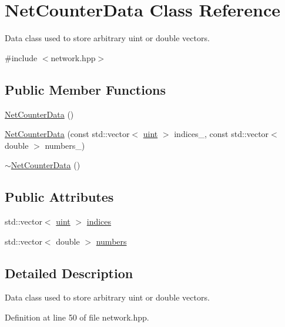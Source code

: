\hypertarget{class_net_counter_data}{}\section{Net\+Counter\+Data Class Reference}
\label{class_net_counter_data}


Data class used to store arbitrary uint or double vectors.  




{\ttfamily \#include $<$network.\+hpp$>$}

\subsection*{Public Member Functions}
\begin{DoxyCompactItemize}
\item 
\hyperlink{class_net_counter_data_ac3a5083286ad4fad43e6b6d5db1f7caa}{Net\+Counter\+Data} ()
\item 
\hyperlink{class_net_counter_data_ac816e1f8892a4d6f500df387309c1b1b}{Net\+Counter\+Data} (const std\+::vector$<$ \hyperlink{typedefs_8hpp_a91ad9478d81a7aaf2593e8d9c3d06a14}{uint} $>$ indices\+\_\+, const std\+::vector$<$ double $>$ numbers\+\_\+)
\item 
\hyperlink{class_net_counter_data_a2e88fcc7f0296d791fe9f0facd24489f}{$\sim$\+Net\+Counter\+Data} ()
\end{DoxyCompactItemize}
\subsection*{Public Attributes}
\begin{DoxyCompactItemize}
\item 
std\+::vector$<$ \hyperlink{typedefs_8hpp_a91ad9478d81a7aaf2593e8d9c3d06a14}{uint} $>$ \hyperlink{class_net_counter_data_ae2f47af99f3fa785d3faac089ab90d83}{indices}
\item 
std\+::vector$<$ double $>$ \hyperlink{class_net_counter_data_ad218e01cd14fb4abfbe21d8d92a6cbd3}{numbers}
\end{DoxyCompactItemize}


\subsection{Detailed Description}
Data class used to store arbitrary uint or double vectors. 

Definition at line 50 of file network.\+hpp.



